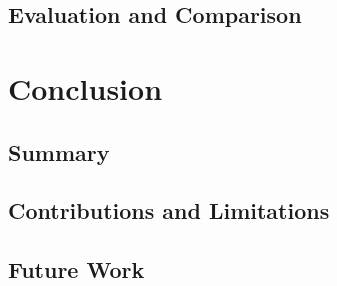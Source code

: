 \documentclass[12pt,a4paper]{article}
\begin{document}
\subsection{Evaluation and Comparison} \label{subsection:evaluationandcomparison}





%
%
%
%
%
%
%
%
\newpage
\section{Conclusion} \label{section:conclusion}


\subsection{Summary} \label{subsection:summary}


\subsection{Contributions and Limitations} \label{subsection:contributionsandlimitations}


\subsection{Future Work} \label{subsection:futurework}





%
%
%
%
%
%
%
%
	
\end{document}
